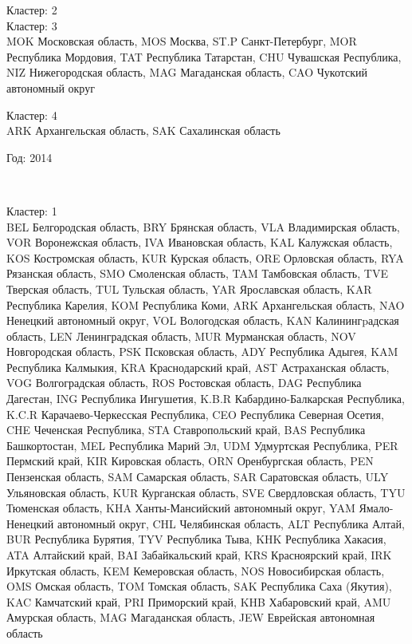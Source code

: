 \documentclass[11pt]{article}
\begin{document}
Кластер:  2 \\


Кластер:  3 \\
MOK Московская область, MOS Москва, ST.P Санкт-Петербург, MOR Республика Мордовия, TAT Республика Татарстан, CHU Чувашская Республика, NIZ Нижегородская область, MAG Магаданская область, CAO Чукотский автономный округ

Кластер:  4 \\
ARK Архангельская область, SAK Сахалинская область


\begin{center}
Год:  2014
\end{center}


    \begin{center}
    \end{center}
    { \hspace*{\fill} \\}
    

Кластер:  1 \\
BEL Белгородская область, BRY Брянская область, VLA Владимирская область, VOR Воронежская область, IVA Ивановская область, KAL Калужская область, KOS Костромская область, KUR Курская область, ORE Орловская область, RYA Рязанская область, SMO Смоленская область, TAM Тамбовская область, TVE Тверская область, TUL Тульская область, YAR Ярославская область, KAR Республика Карелия, KOM Республика Коми, ARK Архангельская область, NAO Ненецкий автономный округ, VOL Вологодская область, KAN Калинингpадская область, LEN Ленинградская область, MUR Мурманская область, NOV Новгородская область, PSK Псковская область, ADY Республика Адыгея, KAM Республика Калмыкия, KRA Краснодарский край, AST Астраханская область, VOG Волгоградская область, ROS Ростовская область, DAG Республика Дагестан, ING Республика Ингушетия, K.B.R Кабардино-Балкарская Республика, K.C.R Карачаево-Черкесская Республика, CEO Республика Северная Осетия, CHE Чеченская Республика, STA Ставропольский край, BAS Республика Башкортостан, MEL Республика Марий Эл, UDM Удмуртская Республика, PER Пермский край, KIR Кировская область, ORN Оренбургская область, PEN Пензенская область, SAM Самарская область, SAR Саратовская область, ULY Ульяновская область, KUR Курганская область, SVE Свердловская область, TYU Тюменская область, KHA Ханты-Мансийский автономный округ, YAM Ямало-Ненецкий автономный округ, CHL Челябинская область, ALT Республика Алтай, BUR Республика Бурятия, TYV Республика Тыва, KHK Республика Хакасия, ATA Алтайский край, BAI Забайкальский край, KRS Красноярский край, IRK Иркутская область, KEM Кемеровская область, NOS Новосибирская область, OMS Омская область, TOM Томская область, SAK Республика Саха (Якутия), KAC Камчатский край, PRI Приморский край, KHB Хабаровский край, AMU Амурская область, MAG Магаданская область, JEW Еврейская автономная область
\end{document}
